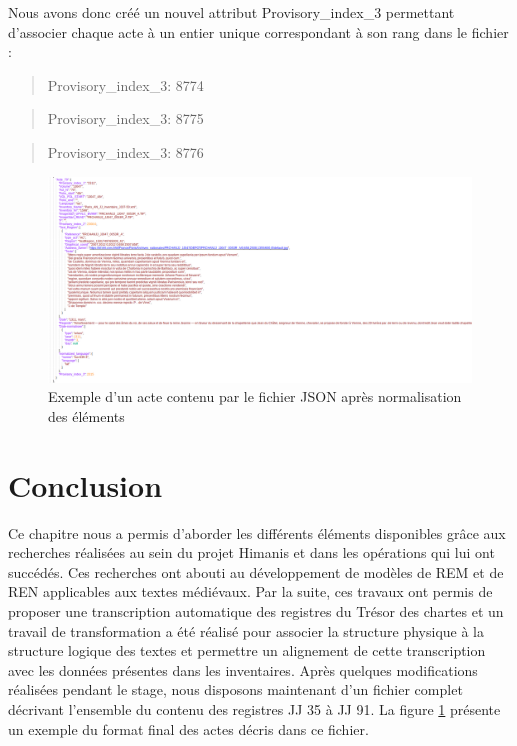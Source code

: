 \documentclass[a4paper,12pt,twoside]{book}
\begin{document}
	\noindent Nous avons donc créé un nouvel attribut \og Provisory\_index\_3\fg{} permettant d'associer chaque acte à un entier unique correspondant à son rang dans le fichier :
	
	\begin{quotation}
		\textquotesingle Provisory\_index\_3\textquotesingle : 8774
	\end{quotation}

	\begin{quotation}
		\textquotesingle Provisory\_index\_3\textquotesingle : 8775
	\end{quotation}
	
	\begin{quotation}
		\textquotesingle Provisory\_index\_3\textquotesingle : 8776
	\end{quotation}

	\begin{figure}
		\centering
		\includegraphics[width=\textwidth]{Images/json_modifie.png}
		\caption{Exemple d'un acte contenu par le fichier JSON après normalisation des éléments}
		\label{json_final}
	\end{figure}
	
	
	\section*{Conclusion}
	
	Ce chapitre nous a permis d'aborder les différents éléments disponibles grâce aux recherches réalisées au sein du projet Himanis et dans les opérations qui lui ont succédés. Ces recherches ont abouti au développement de modèles de REM et de REN applicables aux textes médiévaux. Par la suite, ces travaux ont permis de proposer une transcription automatique des registres du Trésor des chartes et un travail de transformation a été réalisé pour associer la structure physique à la structure logique des textes et permettre un alignement de cette transcription avec les données présentes dans les inventaires. Après quelques modifications réalisées pendant le stage, nous disposons maintenant d'un fichier complet décrivant l'ensemble du contenu des registres JJ 35 à JJ 91. La figure \ref{json_final} présente un exemple du format final des actes décris dans ce fichier.
	
\end{document}
